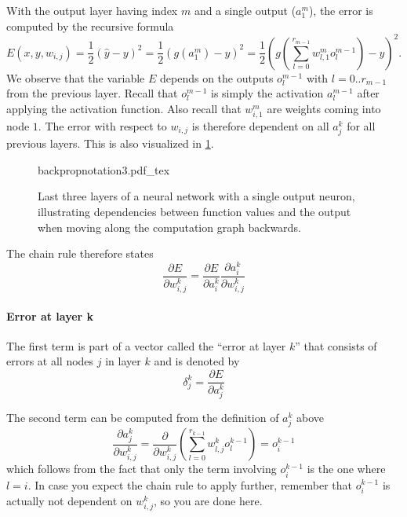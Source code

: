 With the output layer having index $m$ and a single output ($a^m_1$), the error is computed by the recursive formula
\begin{equation}
E(x,y,w_{i,j})=\frac{1}{2}(\hat{y}-y)^2=\frac{1}{2}(g(a_1^m)-y)^2=
\frac{1}{2}\left(g\left(\sum_{l=0}^{r_{m-1}}w_{l,1}^mo_l^{m-1}\right)-y\right)^2.
\end{equation}
We observe that the variable $E$ depends on the outputs $o_l^{m-1}$ with $l=0..r_{m-1}$ from the previous layer. Recall that $o_l^{m-1}$ is simply the activation $a_l^{m-1}$ after applying the activation function. Also recall that $w^m_{i,1}$ are weights coming into node $1$. The error with respect to $w_{i,j}$ is therefore dependent on all $a^k_j$ for all previous layers. This is also visualized in \cref{fig:backpropnotation3}.

\begin{figure}[htb]
    \centering
    \def\svgwidth{\textwidth}
    {backpropnotation3.pdf_tex}
    \caption{Last three layers of a neural network with a single output neuron, illustrating dependencies between function values and the output when moving along the computation graph backwards.\label{fig:backpropnotation3}}
\end{figure}

The chain rule therefore states
\begin{equation}
\frac{\partial E}{\partial w_{i,j}^k}=\frac{\partial E}{\partial a_i^k}\frac{\partial a_i^k}{\partial w_{i,j}^k}
\end{equation}

\paragraph{Error at layer k}
The first term is part of a vector called the ``error at layer $k$''  that consists of errors at all nodes $j$ in layer $k$ and is denoted by
\begin{equation}
\delta^k_j=\frac{\partial E}{\partial a_j^k}
\end{equation}

The second term can be computed from the definition of $a_j^k$ above
\begin{equation}
\frac{\partial a^k_j}{\partial w_{i,j}^k}=\frac{\partial}{\partial w_{i,j}^k}\left(\sum_{l=0}^{r_{k-1}} w_{l,j}^k o^{k-1}_l\right)=o^{k-1}_i
\end{equation}
which follows from the fact that only the term involving $o^{k-1}_i$ is the one where $l=i$. In case you expect the chain rule to apply further, remember that $o^{k-1}_i$ is actually not dependent on $w_{i,j}^k$, so you are done here.

